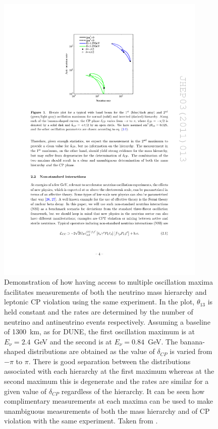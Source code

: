 \begin{figure}
  \centering
  \includegraphics[width=10cm]{TwoPeakAmbiguity.pdf}
  \caption[Demonstration of how having access to multiple oscillation maxima facilitates measurements of both the neutrino mass hierarchy and leptonic CP violation using the same experiment.]{Demonstration of how having access to multiple oscillation maxima facilitates measurements of both the neutrino mass hierarchy and leptonic CP violation using the same experiment.  In the plot, $\theta_{13}$ is held constant and the rates are determined by the number of neutrino and antineutrino events respectively.  Assuming a baseline of 1300~km, as for DUNE, the first oscillation maximum is at $E_{\nu}=2.4$~GeV and the second is at $E_{\nu}=0.84$~GeV.  The banana-shaped distributions are obtained as the value of $\delta_{CP}$ is varied from $-\pi$ to $\pi$.  There is good separation between the distributions associated with each hierarchy at the first maximum whereas at the second maximum this is degenerate and the rates are similar for a given value of $\delta_{CP}$ regardless of the hierarchy.  It can be seen how complimentary measurements at each maxima can be used to make unambiguous measurements of both the mass hierarchy and of CP violation with the same experiment.  Taken from \cite{Huber2011}.}
  \label{fig:TwoPeakAmbiguity}
\end{figure}

